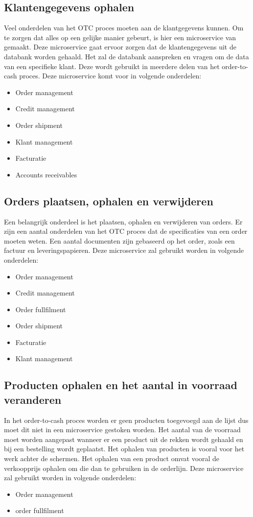 \subsection{Klantengegevens ophalen}
Veel onderdelen van het OTC proces moeten aan de klantgegevens kunnen. Om te zorgen dat alles op een gelijke manier gebeurt, is hier een microservice van gemaakt.
Deze microservice gaat ervoor zorgen dat de klantengegevens uit de databank worden gehaald. Het zal de databank aanspreken en vragen om de data van een specifieke klant. 
Deze wordt gebruikt in meerdere delen van het order-to-cash proces. 
Deze microservice komt voor in volgende onderdelen:
\begin{itemize}
	\item Order management
	\item Credit management
	\item Order shipment
	\item Klant management
	\item Facturatie
	\item Accounts receivables
\end{itemize}

\subsection{Orders plaatsen, ophalen en verwijderen}
Een belangrijk onderdeel is het plaatsen, ophalen en verwijderen van orders. Er zijn een aantal onderdelen van het OTC proces dat de specificaties van een order moeten weten. Een aantal documenten zijn gebaseerd op het order, zoals een factuur en leveringspapieren. 
Deze microservice zal gebruikt worden in volgende onderdelen:
\begin{itemize}
	\item Order management
	\item Credit management
	\item Order fullfilment
	\item Order shipment
	\item Facturatie
	\item Klant management
\end{itemize}

\subsection{Producten ophalen en het aantal in voorraad veranderen}
In het order-to-cash proces worden er geen producten toegevoegd aan de lijst dus moet dit niet in een microservice gestoken worden. Het aantal van de voorraad moet worden aangepast wanneer er een product uit de rekken wordt gehaald en bij een bestelling wordt geplaatst. Het ophalen van producten is vooral voor het werk achter de schermen. Het ophalen van een product omvat vooral de verkoopprijs ophalen om die dan te gebruiken in de orderlijn. 
Deze microservice zal gebruikt worden in volgende onderdelen:
\begin{itemize}
	\item Order management
	\item order fullfilment
\end{itemize}

